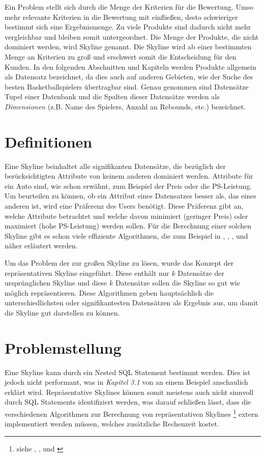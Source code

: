 Ein Problem stellt sich durch die Menge der Kriterien für die Bewertung. Umso mehr relevante Kriterien in die Bewertung mit einfließen, desto schwieriger bestimmt sich eine Ergebnismenge. Zu viele Produkte sind dadurch nicht mehr vergleichbar und bleiben somit untergeordnet. Die Menge der Produkte, die nicht dominiert werden, wird Skyline genannt. Die Skyline wird ab einer bestimmten Menge an Kriterien zu groß und  erschwert somit die Entscheidung für den Kunden. 
In den folgenden Abschnitten und Kapiteln werden Produkte allgemein als Datensatz bezeichnet, da dies auch auf anderen Gebieten, wie der Suche des besten Basketballspielers übertragbar sind.
Genau genommen sind Datensätze Tupel einer Datenbank und die Spalten dieser Datensätze werden als \textit{Dimensionen} (z.B. Name des Spielers, Anzahl an Rebounds, etc.) bezeichnet.
\section{Definitionen}
\label{ch:Einleitung:sec:Definitionen}
Eine Skyline beinhaltet alle signifikanten Datensätze, die bezüglich der berücksichtigten Attribute von keinem anderen dominiert werden. Attribute für ein Auto sind, wie schon erwähnt, zum Beispiel der Preis oder die PS-Leistung. Um beurteilen zu können, ob ein Attribut eines Datensatzes besser als, das eines anderen ist, wird eine Präferenz des Users benötigt. Diese Präferenz gibt an, welche Attribute betrachtet und welche davon minimiert (geringer Preis) oder maximiert (hohe PS-Leistung) werden sollen. Für die Berechnung einer solchen Skyline gibt es schon viele effiziente Algorithmen, die zum Beispiel in \cite{borzsony2001skyline}, \cite{Chan:2006:HDS:2117976.2118017}, \cite{Kossmann:2002:SSS:1287369.1287394}, \cite{Papadias:2003:OPA:872757.872814} und \cite{Tan:2001:EPS:645927.672217} näher erläutert werden.

Um das Problem der zur großen Skyline zu lösen, wurde das Konzept der repräsentativen Skyline eingeführt. Diese enthält nur $k$ Datensätze der ursprünglichen Skyline und diese $k$ Datensätze sollen die Skyline so gut wie möglich repräsentieren. Diese Algorithmen geben hauptsächlich die unterschiedlichsten oder signifikantesten Datensätzen als Ergebnis aus, um damit die Skyline gut darstellen zu können. 
\section{Problemstellung}
\label{ch:Einleitung:sec:Problemstellung}
Eine Skyline kann durch ein Nested SQL Statement bestimmt werden. Dies ist jedoch nicht performant, was in \textit{Kapitel 3.1} von \cite{borzsony2001skyline} an einem Beispiel anschaulich erklärt wird. Repräsentative Skylines können somit meistens auch nicht sinnvoll durch SQL Statements identifiziert werden, was darauf schließen lässt, dass die verschiedenen Algorithmen zur Berechnung von repräsentativen Skylines \footnote{siehe \cite{Tao:2009:DRS:1546683.1547325}, \cite{cai2015efficient}, \cite{magnani2014taking} und \cite{4221657}} extern implementiert werden müssen, welches zusätzliche Rechenzeit kostet.

